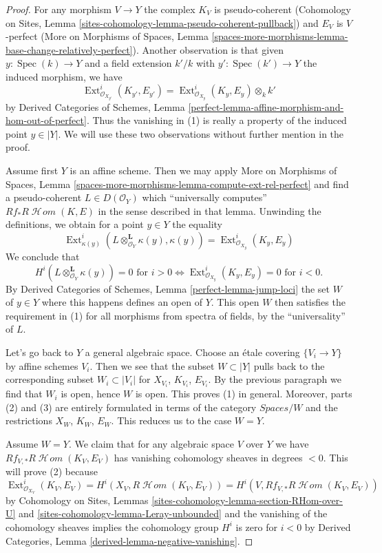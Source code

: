 \documentclass{stacks-project}
\theoremstyle{plain}
\theoremstyle{definition}
\theoremstyle{remark}
\numberwithin{equation}{subsection}
\def\Spec{\mathop{\mathrm{Spec}}}
\def\Ext{\mathop{\mathrm{Ext}}\nolimits}
\def\SheafHom{\mathop{\mathcal{H}\!\mathit{om}}\nolimits}
\begin{document}
\begin{proof}
For any morphism $V \to Y$ the complex $K_V$ is pseudo-coherent
(Cohomology on Sites, Lemma
\ref{sites-cohomology-lemma-pseudo-coherent-pullback})
and $E_V$ is $V$-perfect (More on Morphisms of Spaces, Lemma
\ref{spaces-more-morphisms-lemma-base-change-relatively-perfect}).
Another observation is that given $y : \Spec(k) \to Y$
and a field extension $k'/k$ with $y' : \Spec(k') \to Y$
the induced morphism, we have
$$
\Ext^i_{\mathcal{O}_{X_{y'}}}(K_{y'}, E_{y'}) =
\Ext^i_{\mathcal{O}_{X_y}}(K_y, E_y) \otimes_k k'
$$
by Derived Categories of Schemes, Lemma
\ref{perfect-lemma-affine-morphism-and-hom-out-of-perfect}.
Thus the vanishing in (1) is really a property of the induced
point $y \in |Y|$.
We will use these two observations without further mention in the proof.

\medskip\noindent
Assume first $Y$ is an affine scheme. Then we may apply
More on Morphisms of Spaces, Lemma
\ref{spaces-more-morphisms-lemma-compute-ext-rel-perfect}
and find a pseudo-coherent $L \in D(\mathcal{O}_Y)$ which
``universally computes'' $Rf_*R\SheafHom(K, E)$ in the sense
described in that lemma. Unwinding the definitions, we obtain
for a point $y \in Y$ the equality
$$
\Ext^i_{\kappa(y)}(L \otimes_{\mathcal{O}_Y}^\mathbf{L} \kappa(y),
\kappa(y)) = \Ext^i_{\mathcal{O}_{X_y}}(K_y, E_y)
$$
We conclude that
$$
H^i(L \otimes_{\mathcal{O}_Y}^\mathbf{L} \kappa(y)) = 0
\text{ for } i > 0 \Leftrightarrow
\Ext^i_{\mathcal{O}_{X_y}}(K_y, E_y) = 0 \text{ for }i < 0.
$$
By Derived Categories of Schemes, Lemma \ref{perfect-lemma-jump-loci}
the set $W$ of $y \in Y$ where this happens defines an open of $Y$.
This open $W$ then satisfies the requirement in (1) for all morphisms
from spectra of fields, by the ``universality'' of $L$.

\medskip\noindent
Let's go back to $Y$ a general algebraic space.
Choose an \'etale covering $\{V_i \to Y\}$ by affine schemes $V_i$.
Then we see that the subset $W \subset |Y|$ pulls back to the corresponding
subset $W_i \subset |V_i|$ for $X_{V_i}$, $K_{V_i}$, $E_{V_i}$.
By the previous paragraph we find that $W_i$ is open, hence $W$ is open.
This proves (1) in general. Moreover, parts (2) and (3) are entirely formulated
in terms of the category $\textit{Spaces}/W$ and the restrictions
$X_W$, $K_W$, $E_W$. This reduces us to the case $W = Y$.

\medskip\noindent
Assume $W = Y$. We claim that for any algebraic space $V$ over $Y$
we have $Rf_{V, *}R\SheafHom(K_V, E_V)$ has vanishing cohomology
sheaves in degrees $< 0$. This will prove (2) because
$$
\Ext^i_{\mathcal{O}_{X_V}}(K_V, E_V) =
H^i(X_V, R\SheafHom(K_V, E_V)) = 
H^i(V, Rf_{V, *}R\SheafHom(K_V, E_V))
$$
by Cohomology on Sites, Lemmas
\ref{sites-cohomology-lemma-section-RHom-over-U} and
\ref{sites-cohomology-lemma-Leray-unbounded}
and the vanishing of the cohomology sheaves implies the
cohomology group $H^i$ is zero for $i < 0$ by
Derived Categories, Lemma \ref{derived-lemma-negative-vanishing}.


\end{proof}
\end{document}
